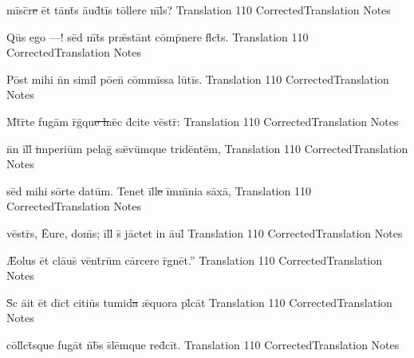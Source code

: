 \documentclass[]{book}
\begin{document}
\latline
  {m\=isc\={}r\sout{e }\=et t\=ant\={}s \={au}d\={}t\=is t\=oll\-er\-e m\={}l\={}s?}
  { Translation }
  {110}
  { CorrectedTranslation }
  { Notes }


\latline
  {Qu\={}s \-eg\-o ---! s\=ed m\={}t\={}s pr\={\ae}st\=ant c\=omp\={}n\-er\-e fl\={}ct\={}s.}
  { Translation }
  {110}
  { CorrectedTranslation }
  { Notes }



\newpage

\latline
  {P\=ost m\-ih\-i n\={}n s\-im\-il\={\macron {\i}} p\={oe}n\={} c\=omm\=iss\-a l\-u\={}t\=is.}
  { Translation }
  {110}
  { CorrectedTranslation }
  { Notes }


\latline
  {M\={}t\={}r\={}t\-e f\-ug\=am r\={}g\={\macron {\i}}qu\sout{e h}\={\ae}c d\={\macron {\i}}c\-it\-e v\=estr\={}:}
  { Translation }
  {110}
  { CorrectedTranslation }
  { Notes }


\latline
  {n\={}n \=ill\={\macron {\i}}\sout{ i}mp\-er\-i\=um p\-el\-ag\={\macron {\i}} s\={\ae}v\=umqu\-e tr\-id\=ent\=em,}
  { Translation }
  {110}
  { CorrectedTranslation }
  { Notes }



\newpage

\latline
  {s\=ed m\-ih\-i s\=ort\-e d\-at\=um.  T\-en\-et \=ill\sout{e }\=imm\={}n\-i\-a s\=ax\=a,}
  { Translation }
  {110}
  { CorrectedTranslation }
  { Notes }


\latline
  {v\=estr\={}s, \={Eu}r\-e, d\-om\={}s; \=ill\={} s\={} j\=act\-et \-in \={au}l\={}}
  { Translation }
  {110}
  { CorrectedTranslation }
  { Notes }


\latline
  {\={\AE}\-ol\-us \=et cl\={au}s\={} v\=ent\={}r\=um c\=arc\-er\-e r\={}gn\=et.''}
  { Translation }
  {110}
  { CorrectedTranslation }
  { Notes }



\newpage

\latline
  {S\={\macron {\i}}c \={ai}t \=et d\=ict\={} c\-it\-i\=us t\-um\-id\sout{a }\={\ae}qu\-or\-a pl\={}c\=at}
  { Translation }
  {110}
  { CorrectedTranslation }
  { Notes }


\latline
  {c\=oll\={}ct\={}squ\-e f\-ug\=at n\={}b\={}s s\={}l\=emqu\-e r\-ed\={}c\=it.}
  { Translation }
  {110}
  { CorrectedTranslation }
  { Notes }
\end{document}
